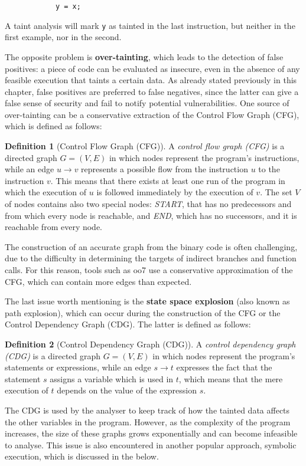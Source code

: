 \documentclass[target=mst,aauheader=aics]{thud}
\theoremstyle{definition}
\newtheorem{defn}{Definition}
\begin{document}
	\vspace{3mm}
	\begin{minipage}{.15\textwidth}
		\begin{lstlisting}
			y = x;
		\end{lstlisting}
	\end{minipage}
	
	A taint analysis will mark \texttt{y} as tainted in the last instruction, but neither in the first example, nor in the second.
	
	The opposite problem is \textbf{over-tainting}, which leads to the detection of false positives: a piece of code can be evaluated as insecure, even in the absence of any feasible execution that taints a certain data. As already stated previously in this chapter, false positives are preferred to false negatives, since the latter can give a false sense of security and fail to notify potential vulnerabilities. One source of over-tainting can be a conservative extraction of the Control Flow Graph (CFG), which is defined as follows:
	\begin{defn}[Control Flow Graph (CFG)]
		A \textit{control flow graph (CFG)} is a directed graph $G=(V,E)$ in which nodes represent the program's instructions, while an edge $u \rightarrow v$ represents a possible flow from the instruction $u$ to the instruction $v$. This means that there exists at least one run of the program in which the execution of $u$ is followed immediately by the execution of $v$. The set $V$ of nodes contains also two special nodes: \textit{START}, that has no predecessors and from which every node is reachable, and \textit{END}, which has no successors, and it is reachable from every node.
	\end{defn}
	
	The construction of an accurate graph from the binary code is often challenging, due to the difficulty in determining the targets of indirect branches and function calls. For this reason, tools such as oo7 \cite{Wang2019} use a conservative approximation of the CFG, which can contain more edges than expected.
	
	The last issue worth mentioning is the \textbf{state space explosion} (also known as path explosion), which can occur during the construction of the CFG or the Control Dependency Graph (CDG). The latter is defined as follows:
	
	\begin{defn}[Control Dependency Graph (CDG)]
		A \textit{control dependency graph (CDG)} \cite{Krinke2007} is a directed graph $G=(V,E)$ in which nodes represent the program's statements or expressions, while an edge $s\rightarrow t$ expresses the fact that the statement $s$ assigns a variable which is used in $t$, which means that the mere execution of $t$ depends on the value of the expression $s$. 
	\end{defn}
	The CDG is used by the analyser to keep track of how the tainted data affects the other variables in the program. However, as the complexity of the program increases, the size of these graphs grows exponentially and can become infeasible to analyse. This issue is also encountered in another popular approach, symbolic execution, which is discussed in the below. 
\end{document}
